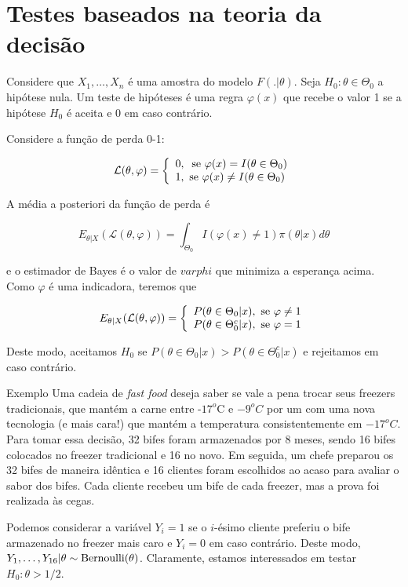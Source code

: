 \documentclass[
  letterpaper,
  DIV=11,
  numbers=noendperiod]{scrreprt}
\theoremstyle{plain}
\theoremstyle{definition}
\theoremstyle{definition}
\theoremstyle{remark}
\begin{document}
\section{Testes baseados na teoria da
decisão}\label{testes-baseados-na-teoria-da-decisuxe3o}

Considere que \(X_1,\ldots,X_n\) é uma amostra do modelo
\(F(.|\theta)\). Seja \(H_0:\theta\in\Theta_0\) a hipótese nula. Um
teste de hipóteses é uma regra \(\varphi(x)\) que recebe o valor 1 se a
hipótese \(H_0\) é aceita e 0 em caso contrário.

Considere a função de perda 0-1:

\[ \mathcal{L}(\theta,\varphi)=\left\{\begin{array}{l}0,\;\;\hbox{se }\varphi(x)=I(\theta\in\Theta_0)\\1,\hbox{  se }\varphi(x)\neq I(\theta\in\Theta_0)\end{array}\right.\]

A média a posteriori da função de perda é

\[E_{\theta|X}(\mathcal{L}(\theta,\varphi))=\int_{\Theta_0}I(\varphi(x)\neq 1)\pi(\theta|x)d\theta\]

e o estimador de Bayes é o valor de \(varphi\) que minimiza a esperança
acima. Como \(\varphi\) é uma indicadora, teremos que

\[E_{\theta|X}(\mathcal{L}(\theta,\varphi))=\left\{\begin{array}{l}P(\theta\in\Theta_0|x),\hbox{ se }\varphi\neq 1\\
P(\theta\in\Theta_0^c|x),\hbox{ se }\varphi= 1
\end{array}\right.\]

Deste modo, aceitamos \(H_0\) se
\(P(\theta\in\Theta_0|x)>P(\theta\in\Theta_0^c|x)\) e rejeitamos em caso
contrário.

Exemplo Uma cadeia de \emph{fast food} deseja saber se vale a pena
trocar seus freezers tradicionais, que mantém a carne entre -\(17^o\)C e
\(-9^oC\) por um com uma nova tecnologia (e mais cara!) que mantém a
temperatura consistentemente em \(-17^oC\). Para tomar essa decisão, 32
bifes foram armazenados por 8 meses, sendo 16 bifes colocados no freezer
tradicional e 16 no novo. Em seguida, um chefe preparou os 32 bifes de
maneira idêntica e 16 clientes foram escolhidos ao acaso para avaliar o
sabor dos bifes. Cada cliente recebeu um bife de cada freezer, mas a
prova foi realizada às cegas.

Podemos considerar a variável \(Y_i=1\) se o \(i\)-ésimo cliente
preferiu o bife armazenado no freezer mais caro e \(Y_i=0\) em caso
contrário. Deste modo,
\(Y_1,\ldots,Y_{16}|\theta\sim\hbox{Bernoulli}(\theta)\). Claramente,
estamos interessados em testar \(H_0:\theta>1/2\).
\end{document}
